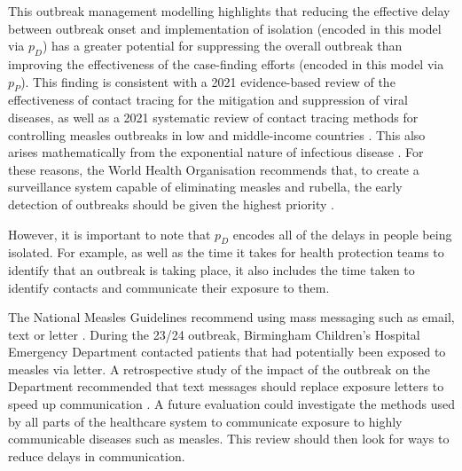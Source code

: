 \documentclass[12pt]{article}
\begin{document}
This outbreak management modelling highlights that reducing the effective delay between outbreak onset and implementation of isolation (encoded in this model via $p_D$) has a greater potential for suppressing the overall outbreak than improving the effectiveness of the case-finding efforts (encoded in this model via $p_P$). This finding is consistent with a 2021 evidence-based review of the effectiveness of contact tracing for the mitigation and suppression of viral diseases, as well as a 2021 systematic review of contact tracing methods for controlling measles outbreaks in low and middle-income countries \cite{craig2021effectiveness, mbivnjo2022measles}. This also arises mathematically from the exponential nature of infectious disease \cite{zhang2024seir}. For these reasons, the World Health Organisation recommends that, to create a surveillance system capable of eliminating measles and rubella, the early detection of outbreaks should be given the highest priority \cite{world2024eliminating}.


However, it is important to note that $p_D$ encodes all of the delays in people being isolated. For example, as well as the time it takes for health protection teams to identify that an outbreak is taking place, it also includes the time taken to identify contacts and communicate their exposure to them.

The National Measles Guidelines recommend using mass messaging such as email, text or letter \cite{UKHSA2026MeaslesGuidelines}. During the 23/24 outbreak, Birmingham Children's Hospital Emergency Department contacted patients that had potentially been exposed to measles via letter. A retrospective study of the impact of the outbreak on the Department recommended that text messages should replace exposure letters to speed up communication \cite{HARRIS202541, 10.1093/jamia/ocac242}. A future evaluation could investigate the methods used by all parts of the healthcare system to communicate exposure to highly communicable diseases such as measles. This review should then look for ways to reduce delays in communication. 
\end{document}
